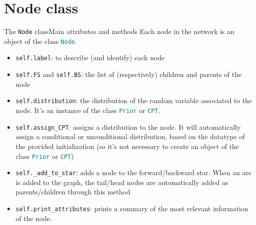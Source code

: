 \documentclass[10pt,xcolor={table,dvipsnames}]{beamer} 		%
\theoremstyle{plain}					%
\theoremstyle{definition}
\theoremstyle{remark}
\newcommand{\ttteal}[1]{\texttt{\textcolor{teal}{#1}}}
\newcommand{\pdb}[1]{\textcolor{pythondb}{#1}}
\begin{document}
\section*{Node class}
	\begin{frame}{The \texttt{Node} class}{Main attributes and methods}
		Each node in the network is an object of the class \ttteal{Node}.
		
		\begin{itemize}
			\item<2-> \texttt{\pdb{self}.label}: to describe (and identify) each node 
			\item<3-> \texttt{\pdb{self}.FS} and \texttt{\pdb{self}.BS}: the list of
			(respectively) children and parents of the node
			\item<4-> \texttt{\pdb{self}.distribution}: the distribution of the 
			random variable associated to the node. 
			It's an instance of the class \ttteal{Prior}
			or \ttteal{CPT}. 
		\end{itemize}

		\begin{itemize}
			\item<5-> \texttt{\pdb{self}.assign\_CPT}: assigns a distribution to 
			the node. It will automatically assign a conditional or 
			unconditional distribution, based on the datatype of the provided initialization 
			(so it's not necessary to create an object of the class \ttteal{Prior} or \ttteal{CPT})
			\item<6-> \texttt{\pdb{self}.\_add\_to\_star}: adds a node to the 
			forward/backward star. When an arc is added to the graph, the 
			tail/head nodes are automatically added as parents/children through this method
			\item<7-> \texttt{\pdb{self}.print\_attributes}: prints a summary of the most 
			relevant information of the node.
		\end{itemize}
	\end{frame}

\end{document}
